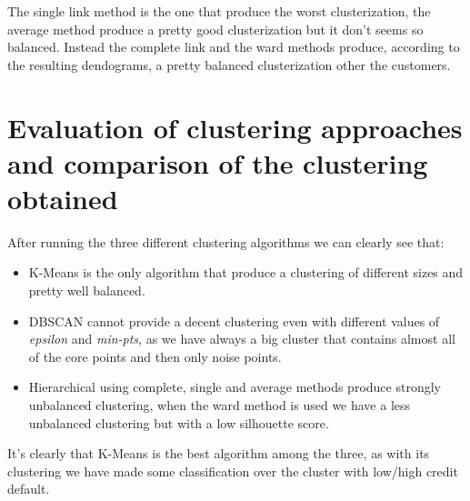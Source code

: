 \medskip

The single link method is the one that produce the worst clusterization, the average method produce a pretty good clusterization but it don't seems so balanced. Instead the complete link and the ward methods produce, according to the resulting dendograms, a pretty balanced clusterization other the customers.

\section{Evaluation of clustering approaches and comparison of the clustering obtained}

After running the three different clustering algorithms we can clearly see that:

\medskip

\begin{itemize}
  \item K-Means is the only algorithm that produce a clustering of different sizes and pretty well balanced.
  \item DBSCAN cannot provide a decent clustering even with different values of \textit{epsilon} and \textit{min-pts}, as we have always a big cluster that contains almost all of the core points and then only noise points.
  \item Hierarchical using complete, single and average methods produce strongly unbalanced clustering, when the ward method is used we have a less unbalanced clustering but with a low silhouette score.
\end{itemize}

\medskip

It's clearly that K-Means is the best algorithm among the three, as with its clustering we have made some classification over the cluster with low/high credit default.
